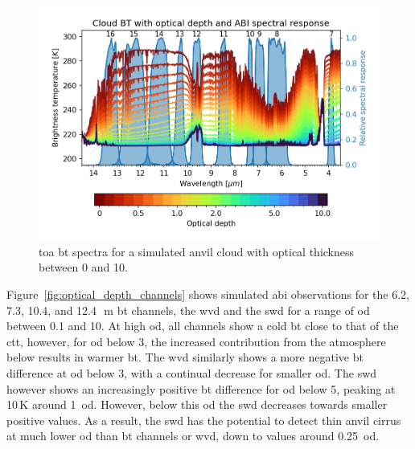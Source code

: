 \begin{figure}[tp]
    \includegraphics[width=\textwidth]{figures/chapter1_08.png}
    \caption[
    \acrshort{toa} \acrshort{bt} spectra for a simulated anvil cloud with optical thickness between 0 and 10
    ]{
    \acrshort{toa} \acrshort{bt} spectra for a simulated anvil cloud with optical thickness between 0 and 10. 
    }
    \label{fig:optical_depth_spectra}
\end{figure}


Figure~\ref{fig:optical_depth_channels} shows simulated \acrshort{abi} observations for the 6.2, 7.3, 10.4, and 12.4\,\unit{\mu m} \acrshort{bt} channels, the \acrshort{wvd} and the \acrshort{swd} for a range of \acrshort{od} between 0.1 and 10.
At high \acrshort{od}, all channels show a cold \acrshort{bt} close to that of the \acrshort{ctt}, however, for \acrshort{od} below 3, the increased contribution from the atmosphere below results in warmer \acrshort{bt}.
The \acrshort{wvd} similarly shows a more negative \acrshort{bt} difference at \acrshort{od} below 3, with a continual decrease for smaller \acrshort{od}.
The \acrshort{swd} however shows an increasingly positive \acrshort{bt} difference for \acrshort{od} below 5, peaking at 10\,\unit{K} around 1~\acrshort{od}.
However, below this \acrshort{od} the \acrshort{swd} decreases towards smaller positive values.
As a result, the \acrshort{swd} has the potential to detect thin anvil cirrus at much lower \acrshort{od} than \acrshort{bt} channels or \acrshort{wvd}, down to values around 0.25~\acrfull{od}.


